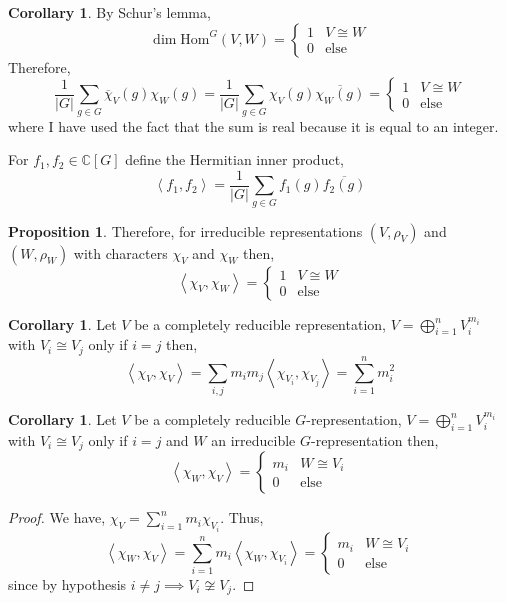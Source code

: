 \documentclass[12pt]{extarticle}
\newcommand{\C}{\mathbb{C}}
\newcommand{\repHom}[3]{\mathrm{Hom}^{#1} \left( #2, #3 \right)}
\newcommand{\inner}[2]{\left<#1, #2 \right>}
\theoremstyle{definition}
\newtheorem{proposition}[theorem]{Proposition}
\newtheorem{corollary}[theorem]{Corollary}
\newenvironment{definition}[1][Definition:]{\begin{trivlist}
\item[\hskip \labelsep {\bfseries #1}]}{\end{trivlist}}
\begin{document}
\begin{corollary}
By Schur's lemma, 
\[ \dim{\repHom{G}{V}{W}} = \begin{cases}
1 & V \cong W \\
0 & \text{else}
\end{cases}\]
Therefore,
\[ \frac{1}{|G|} \sum_{g \in G} \overline{\chi}_V(g) \chi_W(g) = \frac{1}{|G|} \sum_{g \in G} {\chi}_V(g) \overline{\chi_W(g)} =
\begin{cases}
1 & V \cong W \\
0 & \text{else}
\end{cases}\]
where I have used the fact that the sum is real because it is equal to an integer.
\end{corollary}

\begin{definition}
For $f_1, f_2 \in \C[G]$ define the Hermitian inner product,
\[ \inner{f_1}{f_2} = \frac{1}{|G|} \sum_{g \in G} {f_1(g)} \overline{f_2(g)} \]
\end{definition}

\begin{proposition}
Therefore, for irreducible representations $(V, \rho_V)$ and $(W, \rho_W)$ with characters $\chi_V$ and $\chi_W$ then,
\[\inner{\chi_V}{\chi_W} = 
\begin{cases}
1 & V \cong W \\
0 & \text{else}
\end{cases}\]
\end{proposition}

\begin{corollary}
Let $V$ be a completely reducible representation, $V = \bigoplus\limits_{i = 1}^n V_i^{m_i}$ with $V_i \cong V_j$ only if $i = j$ then, 
\[\inner{\chi_V}{\chi_V} = \sum_{i,j} m_i m_j \inner{\chi_{V_i}}{\chi_{V_j}} = \sum_{i =  1}^n m_i^2\]
\end{corollary}

\begin{corollary} \label{chargivesisotofactor}
Let $V$ be a completely reducible $G$-representation, $V = \bigoplus\limits_{i = 1}^n V_i^{m_i}$ with $V_i \cong V_j$ only if $i = j$ and $W$ an irreducible $G$-representation then,
\[ \inner{\chi_W}{\chi_V} = 
\begin{cases}
m_i & W \cong V_i \\
0 & \text{else}
\end{cases}\]
\end{corollary}

\begin{proof}
We have, $\chi_V = \sum_{i = 1}^n m_i \chi_{V_i}$. Thus,
\[ \inner{\chi_W}{\chi_V} = \sum_{i = 1}^n m_i \inner{\chi_W}{\chi_{V_i}} =
\begin{cases}
m_i & W \cong V_i \\
0 & \text{else}
\end{cases}\]
since by hypothesis $i \neq j \implies V_i \not\cong V_j$. 
\end{proof}
\end{document}
